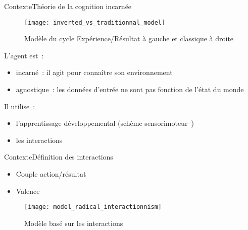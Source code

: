 \documentclass{beamer}
\begin{document}
\begin{frame}{Contexte}{Théorie de la cognition incarnée}
	\begin{figure}
		\texttt{[image: inverted\_vs\_traditionnal\_model]}
		\caption{Modèle du cycle Expérience/Résultat à gauche et classique à droite~\citep{georgeon2014inverting}}
	\end{figure}
	
	L'agent est~:
	\begin{itemize}
		\item incarné~: il agit pour connaître son environnement~\citep{embodied-anderson2003embodied}
		\item agnostique~: les données d'entrée ne sont pas fonction de l'état du monde~\citep{Liris-5510-environment-agnostic}
	\end{itemize}
	Il utilise~:
	\begin{itemize}
		\item l'apprentissage développemental (schème sensorimoteur~\citep{cognitiviste-piaget1959construction})
		\item les interactions
	\end{itemize}
\end{frame}
\begin{frame}{Contexte}{Définition des interactions}
	\begin{itemize}
		\item Couple action/résultat
		\item Valence
	\end{itemize}
	\begin{figure}
		\centering
		\texttt{[image: model\_radical\_interactionnism]}
		\caption{Modèle basé sur les interactions}
	\end{figure}
\end{frame}
\end{document}
